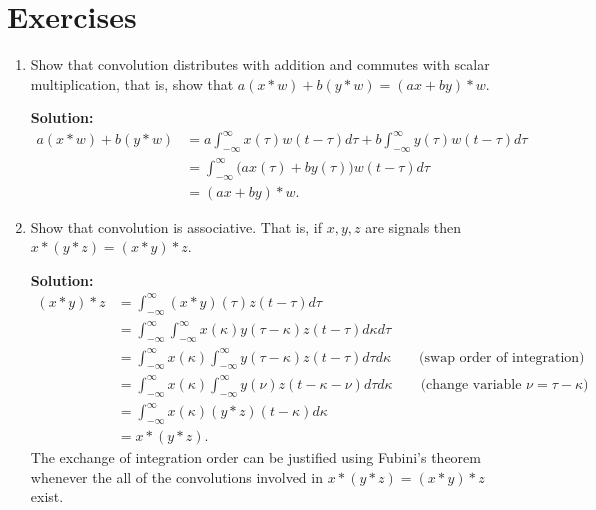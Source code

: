 \documentclass[11pt,a4paper]{book}
\theoremstyle{plain}
\numberwithin{equation}{section}
\newenvironment{solution}{\begin{footnotesize}\textbf{Solution:}}{\end{footnotesize}}
\newenvironment{excersizelist}{%
  \renewcommand*{\theenumi}{\thechapter.\arabic{enumi}}%
  \newcommand\itemadvanced{\stepcounter{enumi}\item[$\ast$\, \theenumi.]}
  \begin{enumerate}
}{%
  \end{enumerate}
}
\begin{document}
\section{Exercises}

\begin{excersizelist}


\item \label{excer:distributivecommutive} Show that convolution distributes with addition and commutes with scalar multiplication, that is, show that $a(x*w) + b(y*w) = (ax+by)*w$.
\begin{solution}
\begin{align*}
a (x * w) + b (y * w) &= a \int_{-\infty}^{\infty} x(\tau) w(t - \tau) d\tau + b \int_{-\infty}^{\infty} y(\tau) w(t - \tau) d\tau \\
&= \int_{-\infty}^{\infty} \big(ax(\tau) + by(\tau)\big) w(t - \tau) d\tau\\
&= (ax + by) * w.
\end{align*}
\end{solution}

\item \label{excer:convassociative} Show that convolution is associative.  That is, if $x,y,z$ are signals then $x*(y*z) = (x*y)*z$. 
\begin{solution}
\begin{align*}
(x*y)*z &= \int_{-\infty}^\infty (x*y)(\tau) z(t - \tau) d\tau \\
&= \int_{-\infty}^\infty \int_{-\infty}^\infty x(\kappa) y(\tau-\kappa) z(t - \tau) d\kappa d\tau \\
&= \int_{-\infty}^\infty x(\kappa)  \int_{-\infty}^\infty y(\tau-\kappa) z(t - \tau)  d\tau d\kappa  \qquad \text{(swap order of integration)} \\
&= \int_{-\infty}^\infty x(\kappa)  \int_{-\infty}^\infty y(\nu) z(t - \kappa - \nu)  d\tau d\kappa  \qquad \text{(change variable $\nu = \tau-\kappa$)} \\
&= \int_{-\infty}^\infty x(\kappa)  (y * z)(t - \kappa) d\kappa \\
&= x*(y*z).
\end{align*}
The exchange of integration order can be justified using Fubini's theorem whenever the all of the convolutions involved in $x*(y*z) = (x*y)*z$ exist.
\end{solution}


\end{excersizelist}
\end{document}
